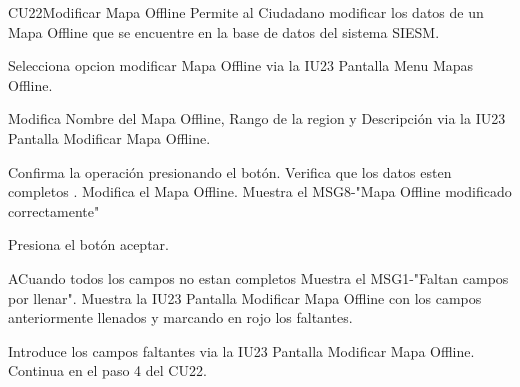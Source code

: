 \begin{UseCase}{CU22}{Modificar Mapa Offline}{
		Permite al Ciudadano modificar los datos de un Mapa Offline que se encuentre en la base de datos del sistema SIESM.\\
		
}
	
\end{UseCase}



\begin{UCtrayectoria}
	\item\UCactor Selecciona opcion modificar Mapa Offline via la IU23 Pantalla Menu Mapas Offline.
	\item\UCactor Modifica Nombre del Mapa Offline, Rango de la region y Descripción via la IU23 Pantalla Modificar Mapa Offline.
	\item\UCactor Confirma la operación presionando el botón.
	\UCpaso Verifica que los datos esten completos .
	\UCpaso Modifica el Mapa Offline.
	\UCpaso Muestra el MSG8-"Mapa Offline modificado correctamente"
	\item\UCactor Presiona el botón aceptar.
\end{UCtrayectoria}


\begin{UCtrayectoriaA}{A}{Cuando todos los campos no estan completos}
	\UCpaso Muestra el MSG1-"Faltan campos por llenar".
	\UCpaso Muestra la IU23 Pantalla Modificar Mapa Offline con los campos anteriormente llenados y marcando en rojo los faltantes.
	\item\UCactor Introduce los campos faltantes via la IU23 Pantalla Modificar Mapa Offline.
	\UCpaso Continua en el paso 4 del CU22.
\end{UCtrayectoriaA}
